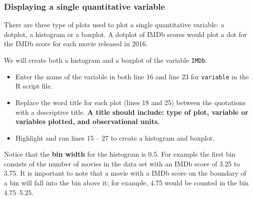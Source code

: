 \documentclass[
]{report}
\begin{document}
\hypertarget{displaying-a-single-quantitative-variable}{%
\subsubsection*{Displaying a single quantitative variable}\label{displaying-a-single-quantitative-variable}}

There are three type of plots used to plot a single quantitative variable: a dotplot, a histogram or a boxplot. A dotplot of IMDb scores would plot a dot for the IMDb score for each movie released in 2016.

We will create both a histogram and a boxplot of the variable \texttt{IMDb}.

\begin{itemize}
\item
  Enter the name of the variable in both line 16 and line 23 for \texttt{variable} in the R script file.
\item
  Replace the word title for each plot (lines 18 and 25) between the quotations with a descriptive title. \textbf{A title should include: type of plot, variable or variables plotted, and observational units.}
\item
  Highlight and run lines 15 -- 27 to create a histogram and boxplot.
\end{itemize}

Notice that the \textbf{bin width} for the histogram is 0.5. For example the first bin consists of the number of movies in the data set with an IMDb score of 3.25 to 3.75. It is important to note that a movie with a IMDb score on the boundary of a bin will fall into the bin above it; for example, 4.75 would be counted in the bin 4.75--5.25.
\end{document}
